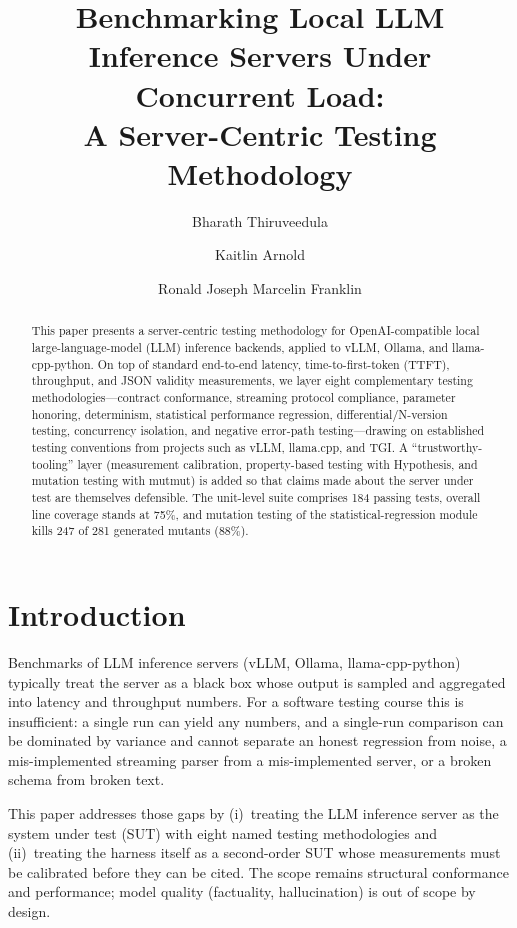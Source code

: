 \documentclass[sigconf,nonacm]{acmart}
\title{Benchmarking Local LLM Inference Servers Under Concurrent Load:\\
A Server-Centric Testing Methodology}
\author{Bharath Thiruveedula}
\affiliation{%
  \institution{The University of Texas at Austin}
  \city{Austin}\state{Texas}\country{USA}}
\author{Kaitlin Arnold}
\affiliation{%
  \institution{The University of Texas at Austin}
  \city{Austin}\state{Texas}\country{USA}}
\author{Ronald Joseph Marcelin Franklin}
\affiliation{%
  \institution{The University of Texas at Austin}
  \city{Austin}\state{Texas}\country{USA}}
\begin{document}
\begin{abstract}
This paper presents a server-centric testing methodology for
OpenAI-compatible local large-language-model (LLM) inference backends,
applied to vLLM, Ollama, and llama-cpp-python. On top of standard
end-to-end latency, time-to-first-token (TTFT), throughput, and JSON
validity measurements, we layer eight complementary testing
methodologies---contract conformance, streaming protocol compliance,
parameter honoring, determinism, statistical performance regression,
differential/N-version testing, concurrency isolation, and negative
error-path testing---drawing on established testing conventions from
projects such as vLLM, llama.cpp, and TGI. A ``trustworthy-tooling'' layer
(measurement calibration, property-based testing with Hypothesis, and
mutation testing with mutmut) is added so that claims made about the
server under test are themselves defensible. The unit-level suite
comprises 184 passing tests, overall line coverage stands at 75\%, and
mutation testing of the statistical-regression module kills 247 of 281
generated mutants (88\%).
\end{abstract}


\maketitle

\section{Introduction}
Benchmarks of LLM inference servers (vLLM, Ollama, llama-cpp-python)
typically treat the server as a black box whose output is sampled and
aggregated into latency and throughput numbers. For a software testing
course this is insufficient: a single run can yield any numbers, and
a single-run comparison can be dominated by variance and cannot
separate an honest regression from noise, a mis-implemented streaming
parser from a mis-implemented server, or a broken schema from broken
text.

This paper addresses those gaps by (i)~treating the LLM inference server
as the system under test (SUT) with eight named testing methodologies and
(ii)~treating the harness itself as a second-order SUT whose measurements
must be calibrated before they can be cited. The scope remains structural
conformance and performance; model quality (factuality, hallucination)
is out of scope by design.
\end{document}
